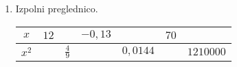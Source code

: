 \documentclass[12pt,a4paper]{article}
\begin{document}
\begin{enumerate}
    \item Izpolni preglednico.
    \begin{table}[H]
        \centering
        \addtolength{\tabcolsep}{7pt}
        \renewcommand{\arraystretch}{2}                
        \begin{tabular}{||c||c|c|c|c|c|c||} 
            \hline \hline
                    $x$ & $12$ & & $-0,13$ & & $70$ &  \\ 
            \hline
                    $x^2$ & & $\frac{4}{9}$ & & $0,0144$ & & $1210000$  \\ 
            \hline \hline
        \end{tabular}
    \end{table}

\end{enumerate}

\newpage
\end{document}
